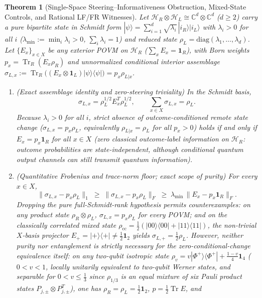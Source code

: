 \documentclass[11pt,a4paper]{article}
\newtheorem{theorem}{Theorem}
\theoremstyle{definition}
\theoremstyle{remark}
\newcommand{\Tr}{\operatorname{Tr}}
\newcommand{\cH}{\mathcal{H}}
\newcommand{\bbC}{\mathbb{C}}
\newcommand{\1}{\mathbf{1}}
\newcommand{\normF}[1]{\|#1\|_F}
\newcommand{\normTr}[1]{\|#1\|_1}
\begin{document}
\begin{theorem}[Single-Space Steering--Informativeness Obstruction, Mixed-State Controls, and Rational LF/FR Witnesses]\label{thm:steering}
Let $\cH_R\otimes\cH_L\cong\bbC^d\otimes\bbC^d$ ($d\ge 2$) carry a pure bipartite state in Schmidt form $|\psi\rangle=\sum_{i=1}^d\sqrt{\lambda_i}\,|i_R\rangle|i_L\rangle$ with $\lambda_i>0$ for all $i$ ($\lambda_{\min}:=\min_i\lambda_i>0$, $\sum_i\lambda_i=1$) and reduced state $\rho_L=\mathrm{diag}(\lambda_1,\dots,\lambda_d)$. Let $\{E_x\}_{x\in X}$ be any exterior POVM on $\cH_R$ ($\sum_x E_x=\1_R$), with Born weights $p_x=\Tr_R(E_x\rho_R)$ and unnormalized conditional interior assemblage $\sigma_{L,x}:=\Tr_R\bigl((E_x\otimes\1_L)|\psi\rangle\langle\psi|\bigr)=p_x\rho_{L|x}$.
\begin{enumerate}
  \item[(a)] \emph{(Exact assemblage identity and zero-steering triviality)} In the Schmidt basis,
  \begin{equation}\label{eq:schmidt-assemblage}
    \sigma_{L,x} = \rho_L^{1/2} E_x^T \rho_L^{1/2},
    \qquad
    \sum_{x\in X}\sigma_{L,x} = \rho_L.
  \end{equation}
  Because $\lambda_i>0$ for all $i$, strict absence of outcome-conditioned remote state change ($\sigma_{L,x}=p_x\rho_L$, equivalently $\rho_{L|x}=\rho_L$ for all $p_x>0$) holds \emph{if and only if} $E_x=p_x\1_R$ for all $x\in X$ (zero classical outcome-label information on $\cH_R$: outcome probabilities are state-independent, although conditional quantum output channels can still transmit quantum information).
  \item[(b)] \emph{(Quantitative Frobenius and trace-norm floor; exact scope of purity)} For every $x\in X$,
  \begin{equation}\label{eq:steering-floor}
    \normTr{\sigma_{L,x}-p_x\rho_L} \;\ge\; \normF{\sigma_{L,x}-p_x\rho_L} \;\ge\; \lambda_{\min}\,\normF{E_x - p_x\1_R}.
  \end{equation}
  Dropping the pure full-Schmidt-rank hypothesis permits counterexamples: on any product state $\rho_R\otimes\rho_L$, $\sigma_{L,x}=p_x\rho_L$ for every POVM; and on the classically correlated mixed state $\rho_{\mathrm{cc}}=\frac{1}{2}(|00\rangle\langle 00|+|11\rangle\langle 11|)$, the non-trivial $X$-basis projector $E_+=|+\rangle\langle +|\neq\frac{1}{2}\1_2$ yields $\sigma_{L,+}=\frac{1}{2}\rho_L$. However, neither purity nor entanglement is strictly necessary for the zero-conditional-change equivalence itself: on any two-qubit isotropic state $\rho_v=v|\Phi^+\rangle\langle\Phi^+|+\frac{1-v}{4}\1_4$ ($0<v<1$, locally unitarily equivalent to two-qubit Werner states, and \emph{separable} for $0<v\le\frac{1}{3}$ since $\rho_{1/3}$ is an equal mixture of six Pauli product states $P_{j,\pm}\otimes P_{j,\pm}^T$), one has $\rho_R=\rho_L=\frac{1}{2}\1_2$, $p=\frac{1}{2}\Tr E$, and

\end{enumerate}
\end{theorem}
\end{document}
